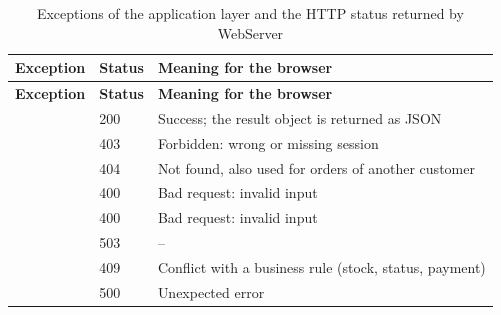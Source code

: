 \begin{longtable}{@{}P{4.6cm}P{1.6cm}P{8.8cm}@{}}
\caption{Exceptions of the application layer and the HTTP status returned by WebServer}\label{tab:errors}\\
\toprule
\footnotesize \textbf{Exception} & \footnotesize \textbf{Status} & \footnotesize \textbf{Meaning for the browser}\\
\midrule
\endfirsthead
\toprule
\footnotesize \textbf{Exception} & \footnotesize \textbf{Status} & \footnotesize \textbf{Meaning for the browser}\\
\midrule
\endhead
\bottomrule
\endlastfoot
\footnotesize {} & \footnotesize 200 & \footnotesize Success; the result object is returned as JSON\\
\footnotesize {} & \footnotesize 403 & \footnotesize Forbidden: wrong or missing session\\
\footnotesize {} & \footnotesize 404 & \footnotesize Not found, also used for orders of another customer\\
\footnotesize {} & \footnotesize 400 & \footnotesize Bad request: invalid input\\
\footnotesize {} & \footnotesize 400 & \footnotesize Bad request: invalid input\\
\footnotesize {} & \footnotesize 503 & \footnotesize --\\
\footnotesize {} & \footnotesize 409 & \footnotesize Conflict with a business rule (stock, status, payment)\\
\footnotesize {} & \footnotesize 500 & \footnotesize Unexpected error\\
\end{longtable}
